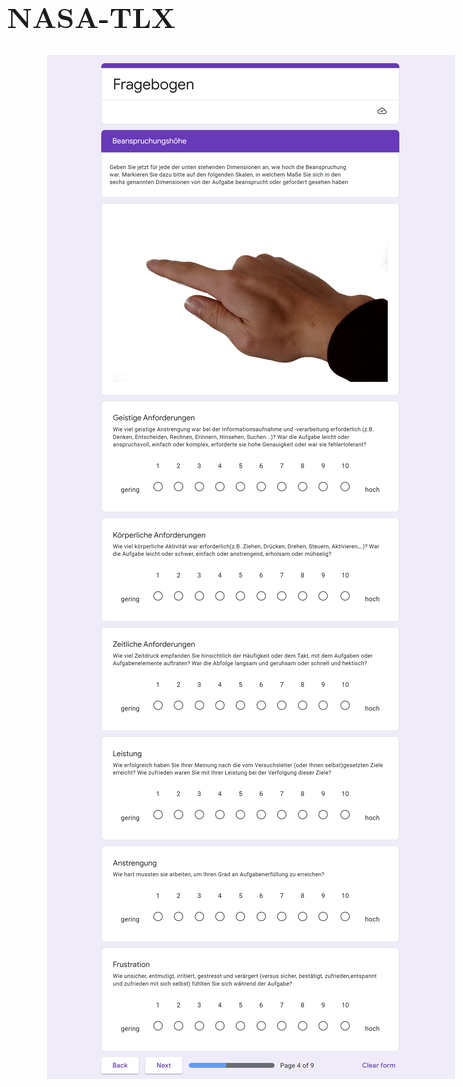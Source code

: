 \section{NASA-TLX}
\begin{figure}[!h]
\centering
\includegraphics[width=\textwidth]{figures/Appendix/nasa tlx.png}
\end{figure}

